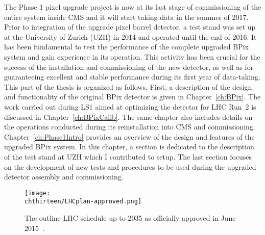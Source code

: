 The Phase 1 pixel upgrade project is now at its last stage of commissioning of the entire system inside CMS and it will start taking data in the summer of 2017.
Prior to integration of the upgrade pixel barrel detector, a test stand was set up at the University of Zurich (UZH) in 2014 and operated until the end of 2016. It has been fundamental to test the performance of the complete upgraded BPix system and gain experience in its operation. This activity has been crucial for the success of the installation and commissioning of the new detector, as well as for guaranteeing excellent and stable performance during its first year of data-taking.\\

This part of the thesis is organized as follows.
First, a description of the design and functionality of the original BPix detector is given in Chapter~\ref{ch:BPix}.
The work carried out during LS1 aimed at optimizing the detector for LHC Run~2 is discussed in Chapter~\ref{ch:BPixCalib}.
The same chapter also includes details on the operations conducted during its reinstallation into CMS and commissioning.
Chapter~\ref{ch:Phase1Intro} provides an overview of the design and features of the upgraded BPix system.
In this chapter, a section is dedicated to the description of the test stand at UZH which I contributed to setup.
The last section focuses on the development of new tests and procedures to be used during the upgraded detector assembly and commissioning.

\begin{figure}[!t]
 \begin{center}
 \texttt{[image: \\chthirteen/LHCplan-approved.png]}
 \end{center}
 \caption{The outline LHC schedule up to 2035 as officially approved in June 2015~\cite{LHCpage}.}
 \label{fig:LHCplan}
\end{figure}